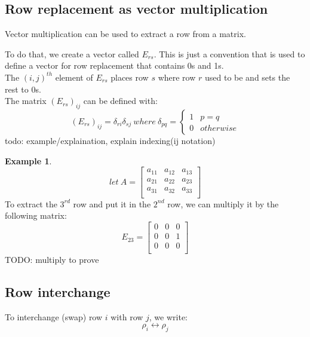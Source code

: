 \documentclass[table]{article}
\theoremstyle{definition}
\newtheorem{ex}{Example}[section]
\begin{document}
  \subsection{Row replacement as vector multiplication}
  Vector multiplication can be used to extract a row from a matrix.

  To do that, we create a vector called $E_{rs}$. This is just a convention that is used to define a vector for row replacement that contains 0s and 1s.\\
  The $(i,j)^{th}$ element of $E_{rs}$ places row $s$ where row $r$ used to be and sets the rest to 0s. \\
  The matrix $(E_{rs})_{ij}$ can be defined with:
  \[(E_{rs})_{ij} = \delta_{ri} \delta_{sj}\ where\ \delta_{pq} = \begin{cases} 1 & p = q \\
    0 & otherwise
  \end{cases} \]
  todo: example/explaination, explain indexing(ij notation)

  \begin{ex}
    \begin{equation}
      let\ A =   \begin{bmatrix}
        a_{11} & a_{12} & a_{13} \\
        a_{21} & a_{22} & a_{23} \\
        a_{31} & a_{32} & a_{33} \\
        \end{bmatrix}
    \end{equation}
    To extract the $3^{rd}$ row and put it in the $2^{nd}$ row, we can multiply it by the following matrix:
    \begin{equation}
      E_{23} =   \begin{bmatrix}
        0 & 0 & 0 \\
        0 & 0 & 1 \\
        0 & 0 & 0 \\
        \end{bmatrix}
    \end{equation}
    TODO: multiply to prove
  \end{ex}

  \subsection{Row interchange}
  To interchange (swap) row $i$ with row $j$, we write:
  \[\rho_i \leftrightarrow \rho_j \]
\end{document}
